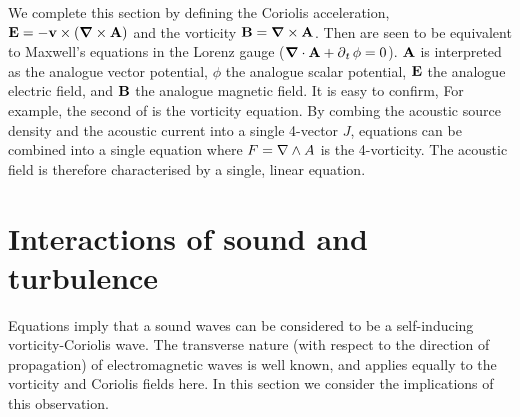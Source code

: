 We complete this section by defining the Coriolis acceleration, $\mathbf{E} = - \textbf{v} \times \left(  \mbox{\boldmath $\nabla$} \times \textbf{A} \right)$ and the vorticity $\mathbf{B} = \mbox{\boldmath $\nabla$} \times \textbf{A}$.
Then  are seen to be equivalent to Maxwell's equations in the Lorenz gauge ($\mbox{\boldmath $\nabla$} \cdot \textbf{A} + \operatorname{\partial}_t \phi = 0$).
$\textbf{A}$ is interpreted as the analogue vector potential, $\phi$ the analogue scalar potential, $\mathbf{E}$ the analogue electric field, and $\mathbf{B}$ the analogue magnetic field.
It is easy to confirm,
For example, the second of  is the vorticity equation. %
By combing the acoustic source density  and the acoustic current into a single 4-vector $J$,
equations  can be combined into a single equation \cite{Doran2003}
where $F = \nabla \wedge A$ is the 4-vorticity.
The acoustic field is therefore characterised by a single, linear equation.


\section{Interactions of sound and turbulence}
Equations  imply that a sound waves can be considered to be a self-inducing vorticity-Coriolis wave.
The transverse nature (with respect to the direction of propagation)  of electromagnetic waves is well known, and applies equally to the vorticity and Coriolis fields here.
In this section we consider the implications of this observation.

